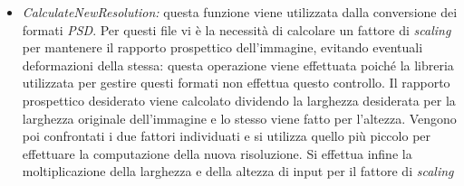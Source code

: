 \begin{itemize}
      \item \emph{CalculateNewResolution:} questa funzione viene utilizzata dalla
            conversione dei formati \emph{PSD}. Per questi file vi è la necessità di
            calcolare un fattore di \emph{scaling} per mantenere il rapporto prospettico
            dell'immagine, evitando eventuali deformazioni della stessa: questa operazione
            viene effettuata poiché la libreria utilizzata per gestire questi formati
            non effettua questo controllo.
            Il rapporto prospettico desiderato viene calcolato dividendo la larghezza desiderata per la larghezza originale
            dell'immagine e lo stesso viene fatto per l'altezza. Vengono poi confrontati
            i due fattori individuati e si utilizza quello più piccolo per effettuare la
            computazione della nuova risoluzione. Si effettua infine la moltiplicazione
            della larghezza e della altezza di input per il fattore di \emph{scaling}
\end{itemize}
